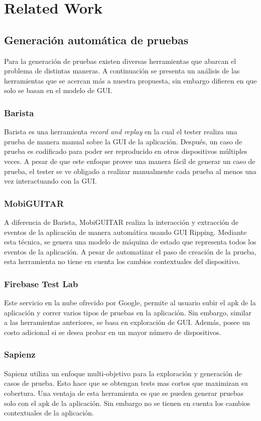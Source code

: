 %
\chapter{Related Work}
\label{chapter2}

\section{Generación automática de pruebas}
Para la generación de pruebas existen diversas herramientas que abarcan el problema de distintas maneras. A continuación se presenta un análisis de las herramientas que se acercan más a nuestra propuesta, sin embargo difieren en que solo se basan en el modelo de GUI.

\subsection{Barista}
Barista \cite{Fazzini2017} es una herramienta \textit{record and replay} en la cual el tester realiza una prueba de manera manual sobre la GUI de la aplicación. Después, un caso de prueba es codificado para poder ser reproducido en otros dispositivos múltiples veces. A pesar de que este enfoque provee una manera fácil de generar un caso de prueba, el tester se ve obligado a realizar manualmente cada prueba al menos una vez interactuando con la GUI.

\subsection{MobiGUITAR}
A diferencia de Barista, MobiGUITAR \cite{MobiGUITAR} realiza la interacción y extracción de eventos de la aplicación de manera automática usando GUI Ripping. Mediante esta técnica, se genera una modelo de máquina de estado que representa todos los eventos de la aplicación. A pesar de automatizar el paso de creación de la prueba, esta herramienta no tiene en cuenta los cambios contextuales del dispositivo.

\subsection{Firebase Test Lab}
Este servicio \cite{firebase} en la nube ofrecido por Google, permite al usuario subir el apk de la aplicación y correr varios tipos de pruebas en la aplicación. Sin embargo, similar a las herramientas anteriores, se basa en exploración de GUI. Además, posee un costo adicional si se desea probar en un mayor número de dispositivos.

\subsection{Sapienz}
Sapienz\cite{sapienz} utiliza un enfoque multi-objetivo para la exploración y generación de casos de prueba. Esto hace que se obtengan tests mas cortos que maximizan	 su cobertura. Una ventaja de esta herramienta es que se pueden generar pruebas solo con el apk de la aplicación. Sin embargo no se tienen en cuenta los cambios contextuales de la aplicación.
